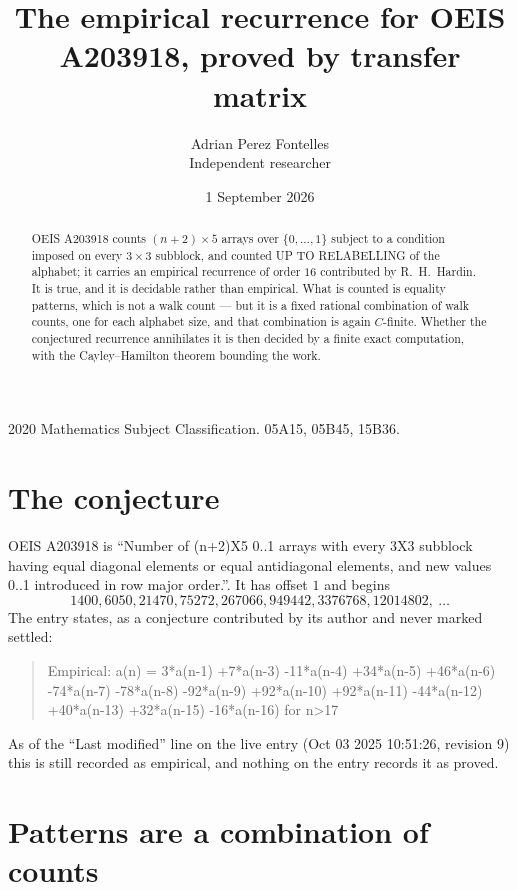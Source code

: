\documentclass[11pt,a4paper]{article}
\title{The empirical recurrence for OEIS A203918, proved by transfer matrix}
\author{Adrian Perez Fontelles\\ \small Independent researcher}
\date{1 September 2026}
\theoremstyle{plain}
\theoremstyle{definition}
\begin{document}
\maketitle

\begin{abstract}
OEIS A203918 counts $(n+2)\times5$ arrays over $\{0,\dots,1\}$ subject to a condition imposed on
every $3\times3$ subblock, and counted UP TO RELABELLING of the
alphabet; it carries an empirical recurrence of order $16$ contributed by
R.~H.~Hardin. It is true, and it is decidable rather than empirical. What is counted is
equality patterns, which is not a walk count --- but it is a fixed rational combination of
walk counts, one for each alphabet size, and that combination is again $C$-finite. Whether the
conjectured recurrence annihilates it is then decided by a finite exact computation, with the
Cayley--Hamilton theorem bounding the work.
\end{abstract}

\noindent\small 2020 Mathematics Subject Classification. 05A15, 05B45, 15B36.\normalsize

\section{The conjecture}

OEIS A203918 is ``Number of (n+2)X5 0..1 arrays with every 3X3 subblock having equal diagonal elements or equal antidiagonal elements, and new values 0..1 introduced in row major order.''. It has offset $1$ and begins
\[
1400, 6050, 21470, 75272, 267066, 949442, 3376768, 12014802,\ \dots
\]
The entry states, as a conjecture contributed by its author and never marked settled:
\begin{quote}
Empirical: a(n) = 3*a(n-1) +7*a(n-3) -11*a(n-4) +34*a(n-5) +46*a(n-6) -74*a(n-7) -78*a(n-8) -92*a(n-9) +92*a(n-10) +92*a(n-11) -44*a(n-12) +40*a(n-13) +32*a(n-15) -16*a(n-16) for n>17
\end{quote}
As of the ``Last modified'' line on the live entry (Oct 03 2025 10:51:26, revision 9) this is still
recorded as empirical, and nothing on the entry records it as proved.

\section{Patterns are a combination of counts}
\end{document}
